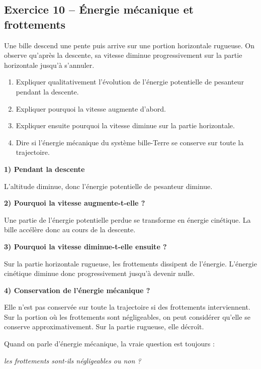 \documentclass[11pt,a4paper]{article}
\begin{document}
\subsection{Exercice 10 -- Énergie mécanique et frottements}

\begin{enoncebox}
Une bille descend une pente puis arrive sur une portion horizontale rugueuse.  
On observe qu'après la descente, sa vitesse diminue progressivement sur la partie horizontale jusqu'à s'annuler.

\begin{enumerate}[label=\arabic*)]
    \item Expliquer qualitativement l'évolution de l'énergie potentielle de pesanteur pendant la descente.
    \item Expliquer pourquoi la vitesse augmente d'abord.
    \item Expliquer ensuite pourquoi la vitesse diminue sur la partie horizontale.
    \item Dire si l'énergie mécanique du système bille-Terre se conserve sur toute la trajectoire.
\end{enumerate}
\end{enoncebox}

\begin{corrigebox}
\textbf{1) Pendant la descente}

L'altitude diminue, donc l'énergie potentielle de pesanteur diminue.

\textbf{2) Pourquoi la vitesse augmente-t-elle ?}

Une partie de l'énergie potentielle perdue se transforme en énergie cinétique.  
La bille accélère donc au cours de la descente.

\textbf{3) Pourquoi la vitesse diminue-t-elle ensuite ?}

Sur la partie horizontale rugueuse, les frottements dissipent de l'énergie.  
L'énergie cinétique diminue donc progressivement jusqu'à devenir nulle.

\textbf{4) Conservation de l'énergie mécanique ?}

Elle n'est pas conservée sur toute la trajectoire si des frottements interviennent.  
Sur la portion où les frottements sont négligeables, on peut considérer qu'elle se conserve approximativement.  
Sur la partie rugueuse, elle décroît.

\begin{methodebox}
Quand on parle d'énergie mécanique, la vraie question est toujours :
\begin{center}
\textit{les frottements sont-ils négligeables ou non ?}
\end{center}
\end{methodebox}
\end{corrigebox}
\end{document}
